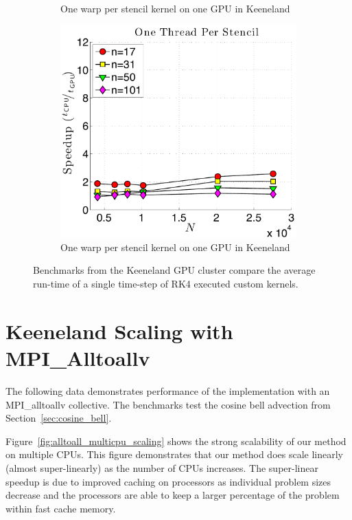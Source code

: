 \begin{figure}
\begin{subfigure}[t]{0.425\textwidth}
\caption{One warp per stencil kernel on one GPU in Keeneland}
\label{fig:gflops_gpu_1proc_oneThread_keeneland}
\end{subfigure}
\quad
\begin{subfigure}[t]{0.425\textwidth}
\includegraphics[width=\textwidth]{../figures/keeneland_results/alltoallv_cosine/speedup_1proc_oneThreadPerStencil.pdf}
\caption{One warp per stencil kernel on one GPU in Keeneland}
\label{fig:speedup_1proc_oneThread_keeneland}
\end{subfigure} 
\caption{Benchmarks from the Keeneland GPU cluster compare the average run-time of a single time-step of RK4 executed custom kernels.}
\end{figure} 

\section{Keeneland Scaling with MPI\_Alltoallv}

The following data demonstrates performance of the implementation with an MPI\_alltoallv collective. The benchmarks test the cosine bell advection from Section~\ref{sec:cosine_bell}. 

Figure~\ref{fig:alltoall_multicpu_scaling} shows the strong scalability of our method on multiple CPUs. This figure demonstrates that our method does scale linearly (almost super-linearly) as the number of CPUs increases. 
The super-linear speedup is due to improved caching on processors as individual problem sizes decrease and the processors are able to keep a larger percentage of the problem within fast cache memory.

